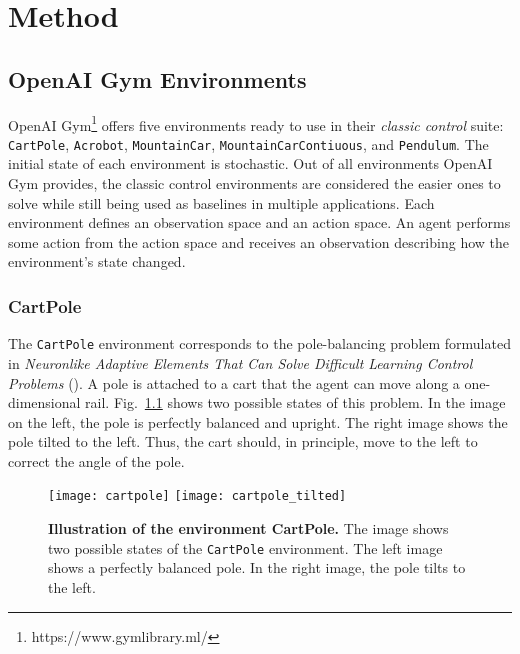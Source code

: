 
\chapter{Method}
\label{ch:method}

\section{OpenAI Gym Environments}
\label{sec:environments}
OpenAI Gym\footnote{https://www.gymlibrary.ml/} offers five environments ready to use in their \textit{classic control} suite: \verb|CartPole|, \texttt{Acrobot}, \verb|MountainCar|, \verb|MountainCarContiuous|, and \verb|Pendulum|. The initial state of each environment is stochastic. Out of all environments OpenAI Gym provides, the classic control environments are considered the easier ones to solve while still being used as baselines in multiple applications. Each environment defines an observation space and an action space. An agent performs some action from the action space and receives an observation describing how the environment's state changed.

\subsection{CartPole}
The \verb|CartPole| environment corresponds to the pole-balancing problem formulated in \emph{Neuronlike Adaptive Elements That Can Solve Difficult Learning Control Problems} (\cite{6313077}). A pole is attached to a cart that the agent can move along a one-dimensional rail. Fig.~\ref{fig:cartpole} shows two possible states of this problem. In the image on the left, the pole is perfectly balanced and upright. The right image shows the pole tilted to the left. Thus, the cart should, in principle, move to the left to correct the angle of the pole.
\begin{figure}[!ht]
  \centering
\texttt{[image: cartpole]} \hspace*{10mm} \texttt{[image: cartpole\_tilted]}
\caption[Illustration of the environment CartPole]{
  \textbf{Illustration of the environment CartPole.}
  The image shows two possible states of the \texttt{CartPole} environment. The left image shows a perfectly balanced pole. In the right image, the pole tilts to the left.
}
\label{fig:cartpole}
\end{figure}

